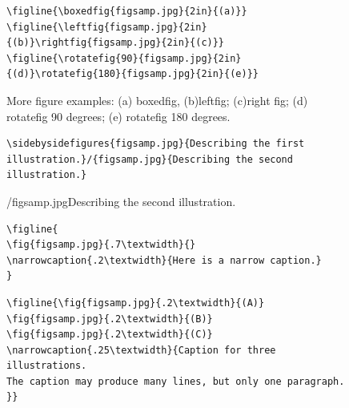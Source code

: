 \documentclass[reprint,NumberedRefs]{JASAnew}
\begin{document}
\begin{figure}
\baselineskip=12pt
\begin{verbatim}
\figline{\boxedfig{figsamp.jpg}{2in}{(a)}}
\figline{\leftfig{figsamp.jpg}{2in}{(b)}\rightfig{figsamp.jpg}{2in}{(c)}}
\figline{\rotatefig{90}{figsamp.jpg}{2in}{(d)}\rotatefig{180}{figsamp.jpg}{2in}{(e)}}
\end{verbatim}




\caption{More figure examples: (a) boxedfig, 
(b)leftfig; (c)right fig; (d) rotatefig 90 degrees;
(e) rotatefig 180 degrees. }

\end{figure}








\begin{figure}
\baselineskip=12pt
\begin{verbatim}
\sidebysidefigures{figsamp.jpg}{Describing the first
illustration.}/{figsamp.jpg}{Describing the second illustration.}
\end{verbatim}

/{figsamp.jpg}{Describing the second illustration.}
\end{figure}


\begin{figure}
\baselineskip=12pt
\begin{verbatim}
\figline{
\fig{figsamp.jpg}{.7\textwidth}{}
\narrowcaption{.2\textwidth}{Here is a narrow caption.}
}
\end{verbatim}
\end{figure}


\begin{figure}
\baselineskip=12pt
\begin{verbatim}
\figline{\fig{figsamp.jpg}{.2\textwidth}{(A)}
\fig{figsamp.jpg}{.2\textwidth}{(B)}
\fig{figsamp.jpg}{.2\textwidth}{(C)}
\narrowcaption{.25\textwidth}{Caption for three illustrations. 
The caption may produce many lines, but only one paragraph.
}}
\end{verbatim}
\end{figure}
\end{document}

